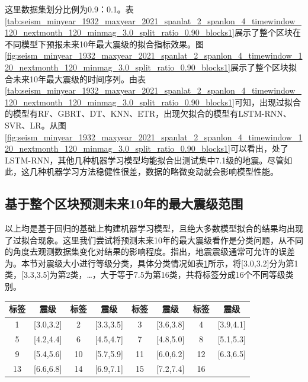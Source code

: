 这里数据集划分比例为0.9：0.1。表\ref{tab:seism_minyear_1932_maxyear_2021_spanlat_2_spanlon_4_timewindow_120_nextmonth_120_minmag_3.0_split_ratio_0.90_blocks1}展示了整个区块在不同模型下预报未来10年最大震级的拟合指标效果。图\ref{fig:seism_minyear_1932_maxyear_2021_spanlat_2_spanlon_4_timewindow_120_nextmonth_120_minmag_3.0_split_ratio_0.90_blocks1}展示了整个区块拟合未来10年最大震级的时间序列。由表\ref{tab:seism_minyear_1932_maxyear_2021_spanlat_2_spanlon_4_timewindow_120_nextmonth_120_minmag_3.0_split_ratio_0.90_blocks1}可知，出现过拟合的模型有RF、GBRT、DT、KNN、ETR，出现欠拟合的模型有LSTM-RNN、SVR、LR。从图\ref{fig:seism_minyear_1932_maxyear_2021_spanlat_2_spanlon_4_timewindow_120_nextmonth_120_minmag_3.0_split_ratio_0.90_blocks1}可以看出，处了LSTM-RNN，其他几种机器学习模型均能拟合出测试集中7.1级的地震。尽管如此，这几种机器学习方法稳健性很差，数据的略微变动就会影响模型性能。



\subsection{基于整个区块预测未来10年的最大震级范围}\label{sec:seism_result_10_class}

以上均是基于回归的基础上构建机器学习模型，且绝大多数模型拟合的结果均出现了过拟合现象。这里我们尝试将预测未来10年的最大震级看作是分类问题，从不同的角度去观测数据集变化对结果的影响程度。\citet{nan2019xinjiang}指出，地震震级通常可允许的误差为。本节对震级大小进行等级分类，具体分类情况如表\ref{tab:seism_class}所示，将[3.0,3.2]分为第1类，[3.3,3.5]为第2类，\ldots，大于等于7.5为第16类，共将标签分成16个不同等级类别。  

\begin{table}[!htbp]
  \centering
  \label{tab:seism_class}
  \footnotesize
  \begin{tabular}{cccccccc}
    \toprule
    标签 & 震级 & 标签 & 震级 & 标签 & 震级 & 标签 & 震级 \\
    \midrule
    1 & [3.0,3.2] & 2 & [3.3,3.5] & 3 & [3.6,3.8] & 4 & [3.9,4.1] \\
    5 & [4.2,4.4] & 6 & [4.5,4.7] & 7 & [4.8,5.0] & 8 & [5.1,5.3] \\
    9 & [5.4,5.6] & 10 & [5.7,5.9] & 11 & [6.0,6.2] & 12 & [6.3,6.5] \\
    13 & [6.6,6.8] & 14 & [6.9,7.1] & 15 & [7.2,7.4] & 16 & \ge 7.5 \\
    \bottomrule
  \end{tabular}
\end{table}


